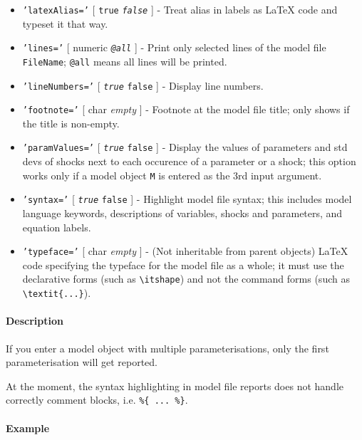 \begin{itemize}
\item
  \texttt{'latexAlias='} {[} \texttt{true} \textbar{}
  \emph{\texttt{false}} {]} - Treat alias in labels as LaTeX code and
  typeset it that way.
\item
  \texttt{'lines='} {[} numeric \textbar{} \emph{\texttt{@all}} {]} -
  Print only selected lines of the model file \texttt{FileName};
  \texttt{@all} means all lines will be printed.
\item
  \texttt{'lineNumbers='} {[} \emph{\texttt{true}} \textbar{}
  \texttt{false} {]} - Display line numbers.
\item
  \texttt{'footnote='} {[} char \textbar{} \emph{empty} {]} - Footnote
  at the model file title; only shows if the title is non-empty.
\item
  \texttt{'paramValues='} {[} \emph{\texttt{true}} \textbar{}
  \texttt{false} {]} - Display the values of parameters and std devs of
  shocks next to each occurence of a parameter or a shock; this option
  works only if a model object \texttt{M} is entered as the 3rd input
  argument.
\item
  \texttt{'syntax='} {[} \emph{\texttt{true}} \textbar{} \texttt{false}
  {]} - Highlight model file syntax; this includes model language
  keywords, descriptions of variables, shocks and parameters, and
  equation labels.
\item
  \texttt{'typeface='} {[} char \textbar{} \emph{empty} {]} - (Not
  inheritable from parent objects) LaTeX code specifying the typeface
  for the model file as a whole; it must use the declarative forms (such
  as \texttt{\textbackslash{}itshape}) and not the command forms (such
  as \texttt{\textbackslash{}textit\{...\}}).
\end{itemize}

\paragraph{Description}

If you enter a model object with multiple parameterisations, only the
first parameterisation will get reported.

At the moment, the syntax highlighting in model file reports does not
handle correctly comment blocks, i.e. \texttt{\%\{ ... \%\}}.

\paragraph{Example}



